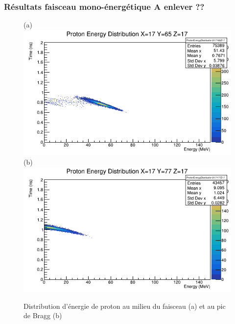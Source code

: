 \documentclass[11pt,a4paper,oldfontcommands]{memoir}
\begin{document}



\newpage

\appendix

\subsubsection{Résultats faisceau mono-énergétique A enlever ??}
\begin{figure}[h!]
\centering
\subfloat(a){\includegraphics[scale=0.37]{CT/130/FaisceauProt.png}}
\subfloat(b){\includegraphics[scale=0.37]{CT/130/BraggProt.png}}
\caption{Distribution d'énergie de proton au milieu du faisceau (a) et au pic de Bragg (b)}
\label{130 prot}
\end{figure}
\end{document}
